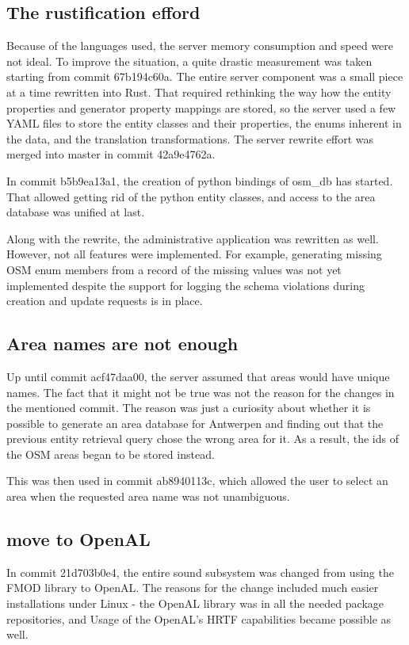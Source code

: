 \documentclass[nolof,digital]{fithesis3}
\begin{document}
\subsection{The rustification efford}
Because of the languages used, the server memory consumption and speed were not ideal. To improve the situation, a quite drastic measurement was taken starting from commit 67b194c60a. The entire server component was a small piece at a time rewritten into Rust. That required rethinking the way how the entity properties and generator property mappings are stored, so the server used a few YAML files to store the entity classes and their properties, the enums inherent in the data, and the translation transformations. The server rewrite effort was merged into master in commit 42a9e4762a.

In commit b5b9ea13a1, the creation of python bindings of osm\_db has started. That allowed getting rid of the python entity classes, and access to the area database was unified at last.

Along with the rewrite, the administrative application was rewritten as well. However, not all features were implemented. For example, generating missing OSM enum members from a record of the missing values was not yet implemented despite the support for logging the schema violations during creation and update requests is in place.
\subsection{Area names are not enough}
Up until commit acf47daa00, the server assumed that areas would have unique names. The fact that it might not be true was not the reason for the changes in the mentioned commit. The reason was just a curiosity about whether it is possible to generate an area database for Antwerpen and finding out that the previous entity retrieval query chose the wrong area for it. As a result, the ids of the OSM areas began to be stored instead.

This was then used in commit ab8940113c, which allowed the user to select an area when the requested area name was not unambiguous.
\subsection{move to OpenAL}
In commit 21d703b0e4, the entire sound subsystem was changed from using the FMOD library \parencite{fmod} to OpenAL. The reasons for the change included much easier installations under Linux - the OpenAL library was in all the needed package repositories, and Usage of the OpenAL's HRTF capabilities became possible as well.
\end{document}
